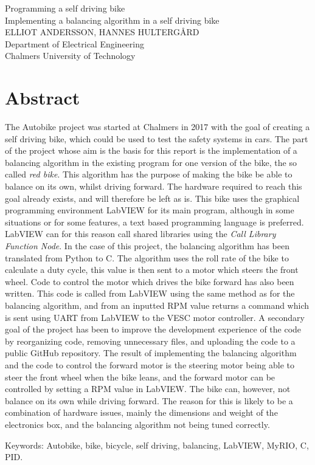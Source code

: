 Programming a self driving bike\\
Implementing a balancing algorithm in a self driving bike\\
ELLIOT ANDERSSON, HANNES HULTERGÅRD\\
Department of Electrical Engineering\\
Chalmers University of Technology \setlength{\parskip}{0.5cm}

\thispagestyle{plain}			%
\setlength{\parskip}{0pt plus 1.0pt}
\section*{Abstract}
The Autobike project was started at Chalmers in 2017 with the goal of creating a
self driving bike, which could be used to test the safety systems in cars. The part of the project whose aim is the basis for this report is the implementation of a balancing algorithm in the existing program for one version of the bike, the so called \textit{red bike}. This algorithm has the purpose of making the bike be able to balance on its own, whilst driving forward. The hardware required to reach this goal already exists, and will therefore be left as is. This bike uses the graphical programming environment LabVIEW for its main program, although in some situations or for some features, a text based programming language is preferred. LabVIEW can for this reason call shared libraries using the \textit{Call Library Function Node}. In the case of this project, the balancing algorithm has been translated from Python to C. The algorithm uses the roll rate of the bike to calculate a duty cycle, this value is then sent to a motor which steers the front wheel. Code to control the motor which drives the bike forward has also been written. This code is called from LabVIEW using the same method as for the balancing algorithm, and from an inputted RPM value returns a command which is sent using UART from LabVIEW to the VESC motor controller. A secondary goal of the project has been to improve the development experience of the code by reorganizing code, removing unnecessary files, and uploading the code to a public GitHub repository. The result of implementing the balancing algorithm and the code to control the forward motor is the steering motor being able to steer the front wheel when the bike leans, and the forward motor can be controlled by setting a RPM value in LabVIEW. The bike can, however, not balance on its own while driving forward. The reason for this is likely to be a combination of hardware issues, mainly the dimensions and weight of the electronics box, and the balancing algorithm not being tuned correctly.

\vfill
Keywords: Autobike, bike, bicycle, self driving, balancing, LabVIEW, MyRIO, C, PID.

\newpage				%
\thispagestyle{empty}
\mbox{}